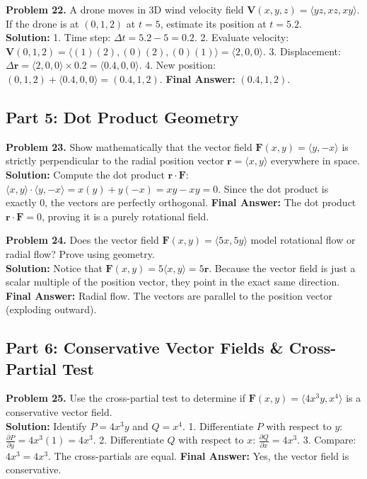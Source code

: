 \documentclass[11pt]{article}
\begin{document}
\vspace{0.3cm}
\textbf{Problem 22.} A drone moves in 3D wind velocity field $\mathbf{V}(x,y,z) = \langle yz, xz, xy \rangle$. If the drone is at $(0, 1, 2)$ at $t=5$, estimate its position at $t=5.2$. \\
\textbf{Solution:}
1. Time step: $\Delta t = 5.2 - 5 = 0.2$.
2. Evaluate velocity: $\mathbf{V}(0, 1, 2) = \langle (1)(2), (0)(2), (0)(1) \rangle = \langle 2, 0, 0 \rangle$.
3. Displacement: $\Delta \mathbf{r} = \langle 2, 0, 0 \rangle \times 0.2 = \langle 0.4, 0, 0 \rangle$.
4. New position: $(0, 1, 2) + \langle 0.4, 0, 0 \rangle = (0.4, 1, 2)$.
\textbf{Final Answer:} $(0.4, 1, 2)$.

\subsection*{Part 5: Dot Product Geometry}

\textbf{Problem 23.} Show mathematically that the vector field $\mathbf{F}(x, y) = \langle y, -x \rangle$ is strictly perpendicular to the radial position vector $\mathbf{r} = \langle x, y \rangle$ everywhere in space. \\
\textbf{Solution:}
Compute the dot product $\mathbf{r} \cdot \mathbf{F}$:
$\langle x, y \rangle \cdot \langle y, -x \rangle = x(y) + y(-x) = xy - xy = 0$.
Since the dot product is exactly 0, the vectors are perfectly orthogonal.
\textbf{Final Answer:} The dot product $\mathbf{r} \cdot \mathbf{F} = 0$, proving it is a purely rotational field.

\vspace{0.3cm}
\textbf{Problem 24.} Does the vector field $\mathbf{F}(x,y) = \langle 5x, 5y \rangle$ model rotational flow or radial flow? Prove using geometry. \\
\textbf{Solution:}
Notice that $\mathbf{F}(x,y) = 5\langle x, y \rangle = 5\mathbf{r}$. 
Because the vector field is just a scalar multiple of the position vector, they point in the exact same direction. 
\textbf{Final Answer:} Radial flow. The vectors are parallel to the position vector (exploding outward).

\subsection*{Part 6: Conservative Vector Fields \& Cross-Partial Test}

\textbf{Problem 25.} Use the cross-partial test to determine if $\mathbf{F}(x,y) = \langle 4x^3 y, x^4 \rangle$ is a conservative vector field. \\
\textbf{Solution:}
Identify $P = 4x^3 y$ and $Q = x^4$.
1. Differentiate $P$ with respect to $y$: $\frac{\partial P}{\partial y} = 4x^3(1) = 4x^3$.
2. Differentiate $Q$ with respect to $x$: $\frac{\partial Q}{\partial x} = 4x^3$.
3. Compare: $4x^3 = 4x^3$. The cross-partials are equal.
\textbf{Final Answer:} Yes, the vector field is conservative.
\end{document}
